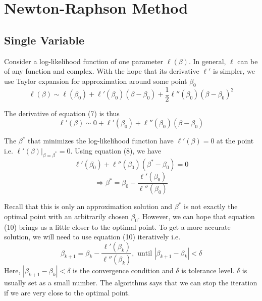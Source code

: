\documentclass[12pt, oneside]{article}
\begin{document}
\section{Newton-Raphson Method}
\subsection{Single Variable}
Consider a log-likelihood function of one parameter ${\ell(\beta)}$. In general, $\ell$ can be of any function and complex. With the hope that its derivative $\ell'$ is simpler, we use Taylor expansion for approximation around some point $\beta_0$
\begin{equation}
\ell(\beta)\sim\ell(\beta_0)+\ell'(\beta_0)(\beta-\beta_0)+\frac{1}{2}\ell''(\beta_0)(\beta-\beta_0)^2
\end{equation}

The derivative of equation (7) is thus
\begin{equation}
\ell'(\beta)\sim0+\ell'(\beta_0)+\ell''(\beta_0)(\beta-\beta_0)
\end{equation}


The $\beta^*$ that minimizes the log-likelihood function have $\ell'(\beta)=0$ at the point i.e. ${\ell'(\beta)|_{\beta=\beta^*}=0}$. Using equation (8), we have
\begin{equation}
\ell'(\beta_0)+\ell''(\beta_0)(\beta^*-\beta_0)=0
\end{equation}
\begin{equation}
\Rightarrow\beta^*=\beta_0-\frac{\ell'(\beta_0)}{\ell''(\beta_0)}
\end{equation}

Recall that this is only an approximation solution and $\beta^*$ is not exactly the optimal point with an arbitrarily chosen $\beta_0$. However, we can hope that equation (10) brings us a little closer to the optimal point. To get a more accurate solution, we will need to use equation (10) iteratively i.e.
$$
\beta_{k+1}=\beta_k-\frac{\ell'(\beta_k)}{\ell''(\beta_k)}, \text { until } |\beta_{k+1}-\beta_{k}|<\delta
$$
Here, $|\beta_{k+1}-\beta_{k}|<\delta$ is the convergence condition and $\delta$ is tolerance level. $\delta$ is usually set as a small number. The algorithms says that we can stop the iteration if we are very close to the optimal point.
\end{document}
